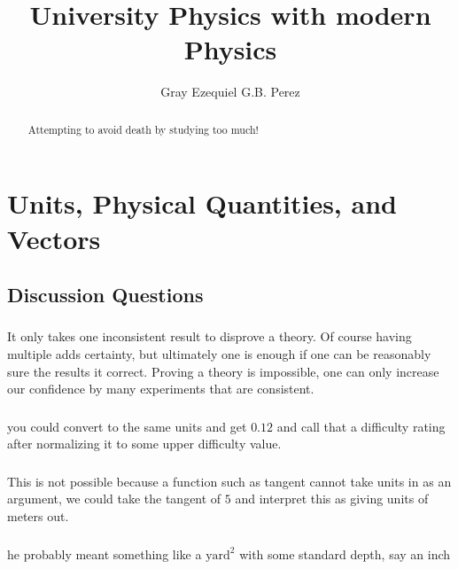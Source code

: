 \documentclass[%
 reprint,
superscriptaddress,
 amsmath,amssymb,
 aps,
prc,
]{revtex4-1}
\begin{document}

\title{University Physics with modern Physics}%

\author{Gray Ezequiel G.B. Perez}

%

\begin{abstract}
Attempting to avoid death by studying too much!
\end{abstract}
\maketitle
\tableofcontents
\section{Units, Physical Quantities, and Vectors}
\subsection{Discussion Questions}
\subsubsection{}
It only takes one inconsistent result to disprove a theory. Of course having multiple adds certainty, but ultimately one is enough if one can be reasonably 
sure the results it correct. Proving a theory is impossible, one can only increase our confidence by many experiments that are consistent.

\subsubsection{}
you could convert to the same units and get $0.12$ and call that a difficulty rating after normalizing it to some upper difficulty value.

\subsubsection{}
This is not possible because a function such as tangent cannot take units in as an argument, we could take the tangent of $5$ and interpret this as giving
units of meters out.

\subsubsection{}
he probably meant something like a $\text{yard}^2$ with some standard depth, say an inch
\end{document}
